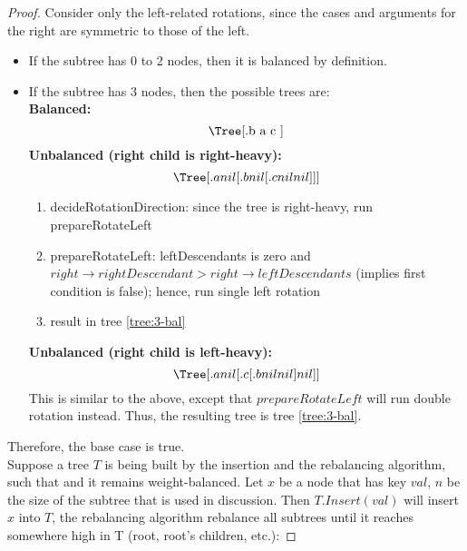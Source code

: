 \documentclass[12pt]{article}
\begin{document}
\begin{proof}
 Consider only the left-related rotations, since the cases and arguments for the right are symmetric to those of the left.

\begin{itemize}
\item
If the subtree has 0 to 2 nodes, then it is balanced by definition.
\item
If the subtree has 3 nodes, then the possible trees are:\\
{\bf Balanced:}\\
\begin{equation}\label{tree:3-bal}
\text{\Tree[.b a c ]}\\ 
\end{equation}
{\bf Unbalanced (right child is right-heavy):}\\
\begin{equation}\label{tree:3-rh}
\Tree[.a nil [.b nil [.c nil nil ] ] ]\\
\end{equation}
\begin{enumerate}
	\item decideRotationDirection: since the tree is right-heavy, run prepareRotateLeft
	\item prepareRotateLeft: leftDescendants is zero and $right\rightarrow rightDescendant > right\rightarrow leftDescendants$ (implies first condition is false); hence, run single left rotation
	\item result in tree \ref{tree:3-bal}
\end{enumerate}

{\bf Unbalanced (right child is left-heavy):}\\
\begin{equation}\label{tree:3-rh}
\Tree[.a nil [.c [.b nil nil ] nil ] ]\\
\end{equation}
This is similar to the above, except that $prepareRotateLeft$ will run double rotation instead. Thus, the resulting tree is tree \ref{tree:3-bal}.\\
\end{itemize}
Therefore, the base case is true.\\

 Suppose a tree $T$ is being built by the insertion and the rebalancing algorithm, such that and it remains weight-balanced.
Let $x$ be a node that has key $val$, $n$ be the size of the subtree that is used in discussion.
Then $T.Insert(val)$ will insert $x$ into $T$, the rebalancing algorithm rebalance all subtrees until it reaches somewhere high in T (root, root's children, etc.):


\end{proof}
\end{document}
